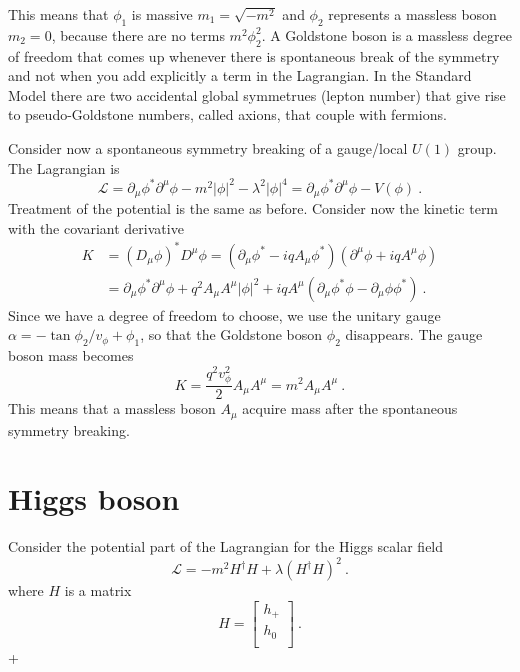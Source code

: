     This means that $\phi_1$ is massive $m_1 = \sqrt{-m^2}$ and $\phi_2$ represents a massless boson $m_2 = 0$, because there are no terms $m^2 \phi_2^2$. A Goldstone boson is a massless degree of freedom that comes up whenever there is spontaneous break of the symmetry and not when you add explicitly a term in the Lagrangian. In the Standard Model there are two accidental global symmetrues (lepton number) that give rise to pseudo-Goldstone numbers, called axions, that couple with fermions. 

    Consider now a spontaneous symmetry breaking of a gauge/local $U(1)$ group. The Lagrangian is 
    \begin{equation*}
        \mathcal L = \partial_\mu \phi^* \partial^\mu \phi - m^2 |\phi|^2 - \lambda^2 |\phi|^4 = \partial_\mu \phi^* \partial^\mu \phi - V(\phi) ~.
    \end{equation*}
    Treatment of the potential is the same as before. Consider now the kinetic term with the covariant derivative 
    \begin{equation*}
    \begin{aligned}
        K & = (D_\mu \phi)^* D^\mu \phi = (\partial_\mu \phi^* - i q A_\mu \phi^*)(\partial^\mu \phi + i q A^\mu \phi) \\ & = \partial_\mu \phi^* \partial^\mu \phi + q^2 A_\mu A^\mu |\phi|^2 + i q A^\mu (\partial_\mu \phi^* \phi - \partial_\mu \phi \phi^* ) ~.
    \end{aligned}
    \end{equation*}
    Since we have a degree of freedom to choose, we use the unitary gauge $\alpha = - \tan \phi_2 / v_\phi + \phi_1$, so that the Goldstone boson $\phi_2$ disappears. The gauge boson mass becomes 
    \begin{equation*}
        K = \frac{q^2 v_\phi^2}{2} A_\mu A^\mu = m^2 A_\mu A^\mu ~.
    \end{equation*}
    This means that a massless boson $A_\mu$ acquire mass after the spontaneous symmetry breaking.

\section{Higgs boson}

    Consider the potential part of the Lagrangian for the Higgs scalar field
    \begin{equation*}
        \mathcal L = - m^2 H^\dagger H + \lambda (H^\dagger H)^2 ~.
    \end{equation*}
    where $H$ is a matrix 
    \begin{equation*}
        H = \begin{bmatrix}
            h_+ \\ h_0 \\
        \end{bmatrix} ~.
    \end{equation*} +

